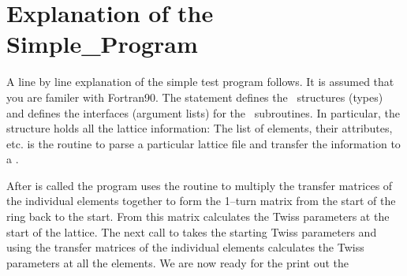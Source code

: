\section{Explanation of the Simple\_Program}

A line by line explanation of the simple test program follows. It is
assumed that you are familer with Fortran90.  The 
statement defines the \bmad\ structures (types) and defines the
interfaces (argument lists) for the \bmad\ subroutines. In particular,
the  structure holds all the lattice information: The
list of elements, their attributes, etc.  is the
routine to parse a particular lattice file and transfer the
information to a . 

After  is called the program uses the routine
 to multiply the transfer matrices of the individual
elements together to form the 1--turn matrix from the start of the ring
back to the start. From this matrix  calculates the
Twiss parameters at the start of the lattice. The next call to
 takes the starting Twiss parameters and using
the transfer matrices of the individual elements calculates the Twiss
parameters at all the elements. We are now ready for the print out the
